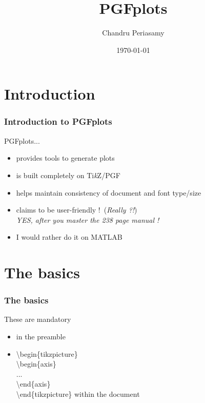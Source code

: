 \documentclass{beamer}
\title{PGFplots}
\author{Chandru Periasamy}
\institute{Department of Mechanical Engineerig\\
						Auburn University}
\date{\today}
\begin{document}
\maketitle
\section{Introduction}
\begin{frame}	
	\frametitle{Introduction to PGFplots}
	PGFplots...\\
	\begin{itemize}
	\item provides tools to generate plots
	\item is built completely on Ti\textit{k}Z/PGF
	\item helps maintain consistency of document and font type/size
	\item claims to be user-friendly !\ (\textit{Really ?!})\\ \pause
	\textit{YES, after you master the 238 page manual !} \pause
	\item I would rather do it on MATLAB\\[20pt]
	\end{itemize}
\end{frame}
\section{The basics}
\begin{frame}
	\frametitle{The basics}
	These are mandatory
	\begin{itemize}
	\item {} \color{black}in the preamble \pause
	\item \color{blue} \textbackslash begin\{tikzpicture\}\\
				\color{blue} \textbackslash begin\{axis\}\\
				...\\
				\color{blue} \textbackslash end\{axis\}\\
				\color{blue} \textbackslash end\{tikzpicture\} \color{black}within the document\\
	\end{itemize}
\end{frame}
\end{document}
